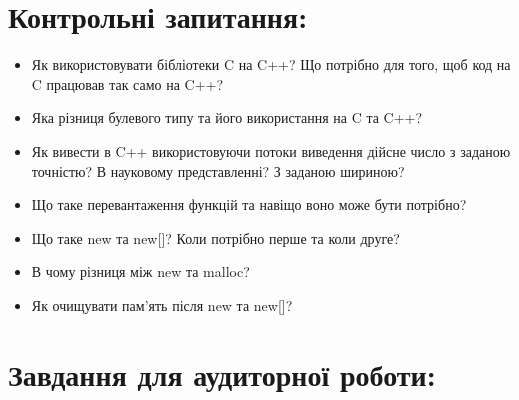 \documentclass[a5paper,titlepage,openany,twoside,
]
{book_unv}%
\begin{document}
\section{Контрольні запитання:}
\begin{itemize}

\item
  Як використовувати бібліотеки C на C++? Що потрібно для того, щоб код
  на C працював так само на C++?
\item
  Яка різниця булевого типу та його використання на C та C++?
\item
  Як вивести в C++ використовуючи потоки виведення дійсне число з
  заданою точністю? В науковому представленні? З заданою шириною?
\item
  Що таке перевантаження функцій та навіщо воно може бути потрібно?
\item
  Що таке new та new{[}{]}? Коли потрібно перше та коли друге?
\item
  В чому різниця між new та malloc?
\item
  Як очищувати пам'ять після new та new{[}{]}?
\end{itemize}

\section{Завдання для аудиторної роботи:}
\end{document}
